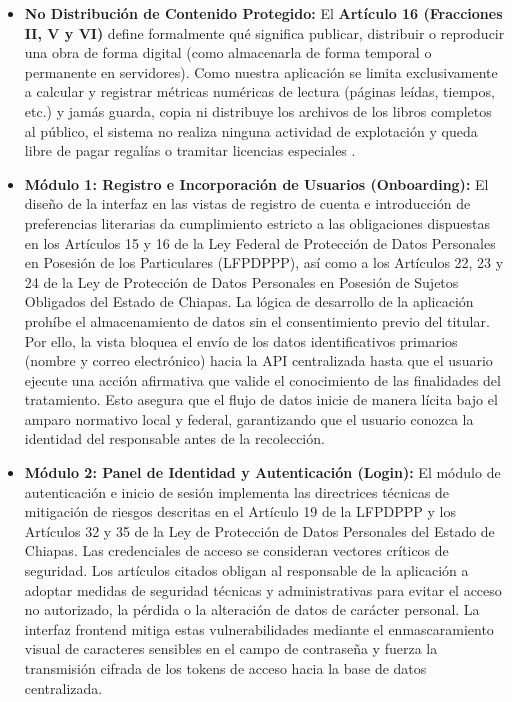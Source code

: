 \documentclass[12pt, atypical, journal]{article}
\begin{document}
\begin{itemize}
    \item \textbf{No Distribución de Contenido Protegido:} El \textbf{Artículo 16 (Fracciones II, V y VI)} define formalmente qué significa publicar, distribuir o reproducir una obra de forma digital (como almacenarla de forma temporal o permanente en servidores). Como nuestra aplicación se limita exclusivamente a calcular y registrar métricas numéricas de lectura (páginas leídas, tiempos, etc.) y jamás guarda, copia ni distribuye los archivos de los libros completos al público, el sistema no realiza ninguna actividad de explotación y queda libre de pagar regalías o tramitar licencias especiales \cite{lfda2026}.

    \item \textbf{Módulo 1: Registro e Incorporación de Usuarios (Onboarding):} El diseño de la interfaz en las vistas de registro de cuenta e introducción de preferencias literarias da cumplimiento estricto a las obligaciones dispuestas en los Artículos 15 y 16 de la Ley Federal de Protección de Datos Personales en Posesión de los Particulares (LFPDPPP), así como a los Artículos 22, 23 y 24 de la Ley de Protección de Datos Personales en Posesión de Sujetos Obligados del Estado de Chiapas. La lógica de desarrollo de la aplicación prohíbe el almacenamiento de datos sin el consentimiento previo del titular. Por ello, la vista bloquea el envío de los datos identificativos primarios (nombre y correo electrónico) hacia la API centralizada hasta que el usuario ejecute una acción afirmativa que valide el conocimiento de las finalidades del tratamiento. Esto asegura que el flujo de datos inicie de manera lícita bajo el amparo normativo local y federal, garantizando que el usuario conozca la identidad del responsable antes de la recolección.
    
    \item \textbf{Módulo 2: Panel de Identidad y Autenticación (Login):} El módulo de autenticación e inicio de sesión implementa las directrices técnicas de mitigación de riesgos descritas en el Artículo 19 de la LFPDPPP y los Artículos 32 y 35 de la Ley de Protección de Datos Personales del Estado de Chiapas. Las credenciales de acceso se consideran vectores críticos de seguridad. Los artículos citados obligan al responsable de la aplicación a adoptar medidas de seguridad técnicas y administrativas para evitar el acceso no autorizado, la pérdida o la alteración de datos de carácter personal. La interfaz frontend mitiga estas vulnerabilidades mediante el enmascaramiento visual de caracteres sensibles en el campo de contraseña y fuerza la transmisión cifrada de los tokens de acceso hacia la base de datos centralizada.
    

\end{itemize}
\end{document}

